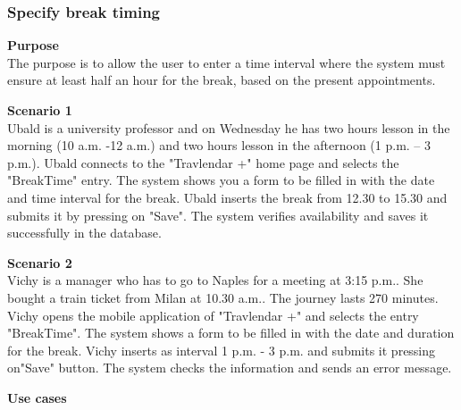 \documentclass{article}
\begin{document}
	\subsubsection{Specify break timing}
	
	\bigskip
	\noindent
	\textbf{Purpose} \\
	The purpose is to allow the user to enter a time interval where the system must ensure at least half an hour for the break, based on the present appointments.
	
	\bigskip
	\noindent
	\textbf{Scenario 1} \\
	Ubald is a university professor and on Wednesday he has two hours lesson in the morning (10 a.m. -12 a.m.) and two hours lesson in the afternoon (1 p.m. – 3 p.m.). Ubald connects to the "Travlendar +" home page and selects the "BreakTime" entry. The system shows you a form to be filled in with the date and time interval for the break. Ubald inserts the break  from 12.30 to 15.30 and submits it by pressing on "Save". The system verifies availability and saves it successfully in the database.
	
	\bigskip
	\noindent
	\textbf{Scenario 2} \\
	Vichy is a manager who has to go to Naples for a meeting at 3:15 p.m.. She bought a train ticket from Milan at 10.30 a.m.. The journey lasts 270 minutes. Vichy opens the mobile application of "Travlendar +" and selects the entry "BreakTime". The system shows a form to be filled in with the date and duration for the break. Vichy inserts as interval 1 p.m. - 3 p.m. and submits it pressing on"Save" button. The system checks the information and sends an error message.
	
	\bigskip
	\noindent
	\textbf{Use cases} \\
	
\end{document}
